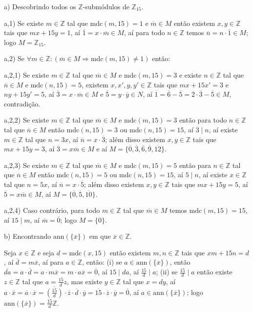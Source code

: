 \documentclass[10pt,a4paper]{article}
\begin{document}
a) Descobrindo todos os $\mathbb{Z}$-submódulos de $\mathbb{Z}_{15}$.

\medskip
\noindent
a,1) Se existe $m\in\mathbb{Z}$ tal que $\mathrm{mdc}(m,15)=1$ e $\overline{m}\in M$ então existem $x,y\in\mathbb{Z}$ tais que $mx+15y=1$, aí $\overline{1}=x\cdot\overline{m}\in M$, aí para todo $n\in\mathbb{Z}$ temos $\overline{n}=n\cdot\overline{1}\in M$; logo $M=\mathbb{Z}_{15}$.

\medskip
\noindent
a,2) Se $\forall m\in\mathbb{Z}:(\overline{m}\in M\Rightarrow\mathrm{mdc}(m,15)\neq 1)$ então:

\medskip
\noindent
a,2,1) Se existe $m\in\mathbb{Z}$ tal que $\overline{m}\in M$ e $\mathrm{mdc}(m,15)=3$ e existe $n\in\mathbb{Z}$ tal que $\overline{n}\in M$ e $\mathrm{mdc}(n,15)=5$, existem $x,x',y,y'\in\mathbb{Z}$ tais que $mx+15x'=3$ e $ny+15y'=5$, aí $\overline{3}=x\cdot\overline{m}\in M$ e $\overline{5}=y\cdot\overline{y}\in N$, aí $\overline{1}=\overline{6}-\overline{5}=2\cdot\overline{3}-\overline{5}\in M$, contradição.

\medskip
\noindent
a,2,2) Se existe $m\in\mathbb{Z}$ tal que $\overline{m}\in M$ e $\mathrm{mdc}(m,15)=3$ então para todo $n\in\mathbb{Z}$ tal que $\overline{n}\in M$ então $\mathrm{mdc}(n,15)=3$ ou $\mathrm{mdc}(n,15)=15$, aí $3\mid n$, aí existe $m\in\mathbb{Z}$ tal que $n=3x$, aí $\overline{n}=x\cdot\overline{3}$; além disso existem $x,y\in\mathbb{Z}$ tais que $mx+15y=3$, aí $\overline{3}=x\overline{m}\in M$ e aí $M=\{\overline{0},\overline{3},\overline{6},\overline{9},\overline{12}\}$.

\medskip
\noindent
a,2,3) Se existe $m\in\mathbb{Z}$ tal que $\overline{m}\in M$ e $\mathrm{mdc}(m,15)=5$ então para $n\in\mathbb{Z}$ tal que $\overline{n}\in M$ então $\mathrm{mdc}(n,15)=5$ ou $\mathrm{mdc}(n,15)=15$, aí $5\mid n$, aí existe $x\in\mathbb{Z}$ tal que $n=5x$, aí $\overline{n}=x\cdot\overline{5}$; além disso existem $x,y\in\mathbb{Z}$ tais que $mx+15y=5$, aí $\overline{5}=x\overline{m}\in M$, aí $M=\{\overline{0},\overline{5},\overline{10}\}$.

\medskip
\noindent
a,2,4) Caso contrário, para todo $m\in\mathbb{Z}$ tal que $\overline{m}\in M$ temos $\mathrm{mdc}(m,15)=15$, aí $15\mid m$, aí $\overline{m}=\overline{0}$; logo $M=\{0\}$.

\medskip
\noindent
b) Encontrando $\mathrm{ann}(\{\overline{x}\})$ em que $\overline{x}\in\mathbb{Z}$.

\medskip
\noindent
Seja $x\in\mathbb{Z}$ e seja $d=\mathrm{mdc}(x,15)$ então existem $m,n\in\mathbb{Z}$ tais que $xm+15n=d$, aí $\overline{d}=m\overline{x}$, aí para $a\in\mathbb{Z}$, então: (i) se $a\in\mathrm{ann}(\{\overline{x}\})$, então $\overline{da}=a\cdot\overline{d}=a\cdot m\overline{x}=m\cdot a\overline{x}=\overline{0}$, aí $15\mid da$, aí $\frac{15}{d}\mid a$; (ii) se $\frac{15}{d}\mid a$ então existe $z\in\mathbb{Z}$ tal que $a=\frac{15}{d}z$, mas existe $y\in\mathbb{Z}$ tal que $x=dy$, aí $a\cdot\overline{x}=\overline{a}\cdot\overline{x}=\overline{\left(\frac{15}{d}\right)}\cdot\overline{z}\cdot\overline{d}\cdot\overline{y}=\overline{15}\cdot\overline{z}\cdot\overline{y}=\overline{0}$, aí $a\in\mathrm{ann}(\{\overline{x}\})$; logo $\mathrm{ann}(\{\overline{x}\})=\frac{15}{d}\mathbb{Z}$.
\end{document}
